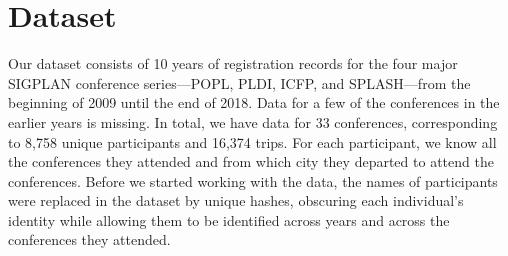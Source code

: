 \section{Dataset}
\label{sec:dataset}

Our dataset consists of 10 years of registration records for the four major
SIGPLAN conference series---POPL, PLDI, ICFP, and SPLASH---from the
beginning of 2009 until the end of 2018. Data for a few of the conferences
in the earlier years is missing. In total, we have data for 33 conferences,
corresponding to 8,758 unique participants and 16,374 trips. For each
participant, we know all the conferences they attended and from which city
they departed to attend the conferences.
%
Before we started working with the data, the names of participants were
replaced in the dataset by unique hashes, obscuring each individual's
identity while allowing them to be identified across years and across the
conferences they attended.
